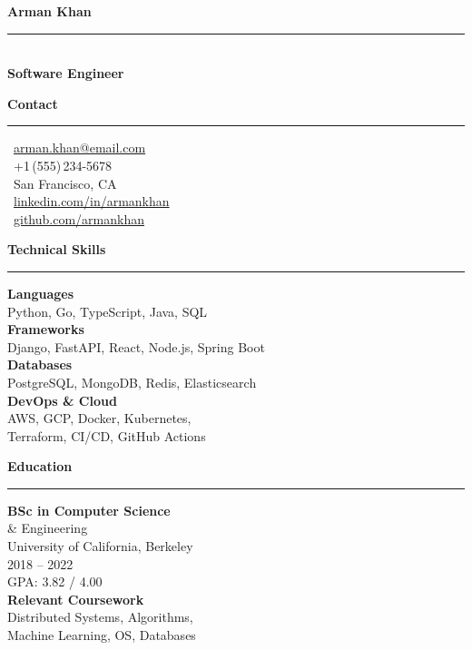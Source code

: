 \documentclass[10pt]{article}
\newlength{\sbw}\setlength{\sbw}{72mm}
\newcommand{\sideheading}[1]{%
  \vspace{4mm}%
  {\bfseries\large\color{white} #1}\\[-1mm]%
  {\color{accent}\rule{\dimexpr\sbw-14mm\relax}{0.6pt}}%
  \vspace{1.5mm}%
}
\begin{document}
\noindent
\begin{minipage}[t]{\sbw}
  \color{sidetext}\vspace{10mm}\hspace{7mm}%
  \begin{minipage}[t]{\dimexpr\sbw-14mm\relax}\RaggedRight

    {\bfseries\LARGE\color{white} Arman Khan}\\[1.5mm]
    {\color{accent}\rule{\dimexpr\sbw-14mm\relax}{0.6pt}}\\[1mm]
    {\bfseries\normalsize\color{lightaccent} Software Engineer}

    \sideheading{Contact}
    \small
    {\faEnvelope}\ \href{mailto:arman.khan@email.com}{arman.khan@email.com}\\[2pt]
    {\faPhone}\ +1\,(555)\,234-5678\\[2pt]
    {\faMapMarker*}\ San Francisco, CA\\[2pt]
    {\faLinkedin}\ \href{https://linkedin.com/in/armankhan}{linkedin.com/in/armankhan}\\[2pt]
    {\faGithub}\ \href{https://github.com/armankhan}{github.com/armankhan}

    \sideheading{Technical Skills}
    \small
    {\bfseries\color{white} Languages}\\[1pt]
    Python, Go, TypeScript, Java, SQL\\[3pt]
    {\bfseries\color{white} Frameworks}\\[1pt]
    Django, FastAPI, React, Node.js, Spring Boot\\[3pt]
    {\bfseries\color{white} Databases}\\[1pt]
    PostgreSQL, MongoDB, Redis, Elasticsearch\\[3pt]
    {\bfseries\color{white} DevOps \& Cloud}\\[1pt]
    AWS, GCP, Docker, Kubernetes,\\
    Terraform, CI/CD, GitHub Actions

    \sideheading{Education}
    \small
    {\bfseries\color{white} BSc in Computer Science}\\[1pt]
    {\color{lightaccent} \& Engineering}\\[2pt]
    University of California, Berkeley\\[1pt]
    {\color{accent} 2018 -- 2022}\\[1pt]
    GPA: 3.82 / 4.00\\[3pt]
    {\bfseries\color{white} Relevant Coursework}\\[1pt]
    Distributed Systems, Algorithms,\\
    Machine Learning, OS, Databases

  \end{minipage}
\end{minipage}\hfill
\end{document}
